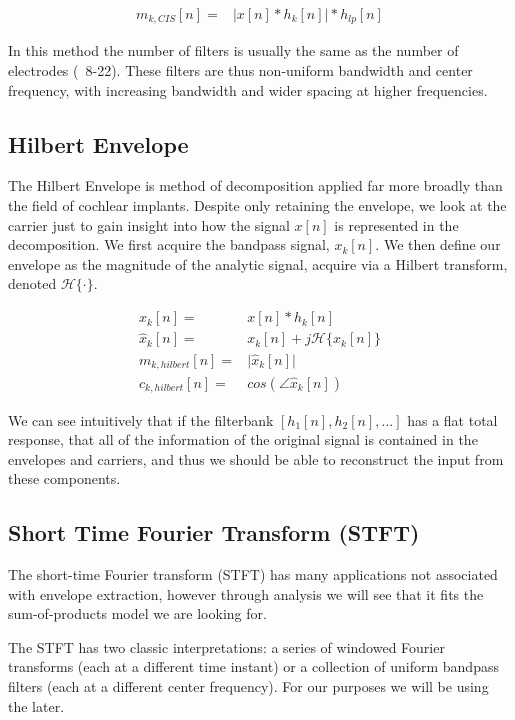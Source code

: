 \documentclass [11pt, proquest,oneside] {ganter_thesis}[2015/03/03]
\begin{document}
\begin{align}
m_{k,CIS}[n] =& \Big| x[n] * h_k[n] \Big| * h_{lp}[n]
\end{align}

In this method the number of filters is usually the same as the number of electrodes (~8-22).  These filters are thus non-uniform bandwidth and center frequency, with increasing bandwidth and wider spacing at higher frequencies.

\subsection{Hilbert Envelope}

The Hilbert Envelope is method of decomposition applied far more broadly than the field of cochlear implants.  Despite only retaining the envelope, we look at the carrier just to gain insight into how the signal $x[n]$ is represented in the decomposition.  We first acquire the bandpass signal, $x_k[n]$.  We then define our envelope as the magnitude of the analytic signal, acquire via a Hilbert transform, denoted $\mathcal{H}\{\cdot\}$.

\begin{align}
x_k[n] =& x[n] * h_k[n] \\
\widehat{x}_k[n] =& x_k[n] + j\mathcal{H}\{x_k[n]\} \\
\label{eq:hilbert_envelope}
m_{k,hilbert}[n] =& \Big| \widehat{x}_k[n] \Big| \\
c_{k,hilbert}[n] =& cos(\angle\widehat{x}_k[n])
\end{align}

We can see intuitively that if the filterbank $[h_1[n], h_2[n], ...]$ has a flat total response, that all of the information of the original signal is contained in the envelopes and carriers, and thus we should be able to reconstruct the input from these components.

\subsection{Short Time Fourier Transform (STFT)}

The short-time Fourier transform (STFT) has many applications not associated with envelope extraction, however through analysis we will see that it fits the sum-of-products model we are looking for.

The STFT has two classic interpretations: a series of windowed Fourier transforms (each at a different time instant) or a collection of uniform bandpass filters (each at a different center frequency).  For our purposes we will be using the later.
\end{document}
